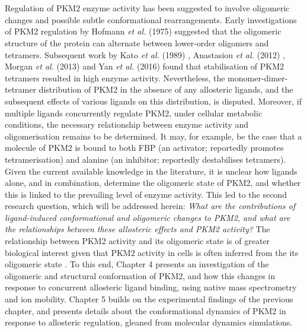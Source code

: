 %
%
\\\\
%
%
Regulation of PKM2 enzyme activity has been suggested to involve oligomeric changes and possible subtle conformational rearrangements. Early investigations of PKM2 regulation by Hofmann \textit{et al.} (1975) \cite{Hofmann:1975aa} suggested that the oligomeric structure of the protein can alternate between lower-order oligomers and tetramers. Subsequent work by Kato \textit{et al.} (1989) \cite{Kato:1989aa}, Anastasiou \textit{et al.} (2012) \cite{Anastasiou:2012aa}, Morgan \textit{et al.} (2013) \cite{Morgan:2013aa} and Yan \textit{et al.} (2016) \cite{Yan:2016aa} found that stabilisation of PKM2 tetramers resulted in high enzyme activity. Nevertheless, the monomer-dimer-tetramer distribution of PKM2 in the absence of any allosteric ligands, and the subsequent effects of various ligands on this distribution, is disputed. Moreover, if multiple ligands concurrently regulate PKM2, under cellular metabolic conditions, the necessary relationship between enzyme activity and oligomerisation remains to be determined. It may, for example, be the case that a molecule of PKM2 is bound to both FBP (an activator; reportedly promotes tetramerisation) and alanine (an inhibitor; reportedly destabilises tetramers). Given the current available knowledge in the literature, it is unclear how ligands alone, and in combination, determine the oligomeric state of PKM2, and whether this is linked to the prevailing level of enzyme activity. This led to the second research question, which will be addressed herein: \textit{What are the contributions of ligand-induced conformational and oligomeric changes to PKM2, and what are the relationships between these allosteric effects and PKM2 activity?} The relationship between PKM2 activity and its oligomeric state is of greater biological interest given that PKM2 activity in cells is often inferred from the its oligomeric state \cite{Anastasiou:2011aa,Anastasiou:2012aa,Christofk:2008ab,Hitosugi:2009aa,Lim:2016aa,Wang:2017aa,Wang:2017ab}. To this end, Chapter 4 presents an investigation of the oligomeric and structural conformation of PKM2, and how this changes in response to concurrent allosteric ligand binding, using native mass spectrometry and ion mobility. Chapter 5 builds on the experimental findings of the previous chapter, and presents details about the conformational dynamics of PKM2 in response to allosteric regulation, gleaned from molecular dynamics simulations.
%
%
\\\\
